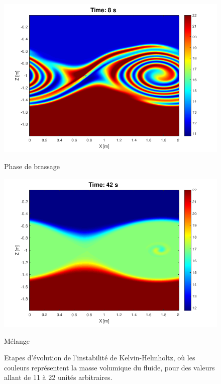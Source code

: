 \documentclass{rapportECC}
\begin{document}
\begin{figure}[htbp]
    \begin{minipage}{0.45\textwidth}
        \centering
        \includegraphics[width=\linewidth]{images/KHI3.png}
        \caption{Phase de brassage}
        \label{fig:KHI3}
    \end{minipage}
    \hspace{0.05\textwidth} %
    \begin{minipage}{0.45\textwidth}
        \centering
        \includegraphics[width=\linewidth]{images/KHI4.png}
        \caption{Mélange}
        \label{fig:KHI4}
    \end{minipage}
    \caption{Etapes d'évolution de l'instabilité de Kelvin-Helmholtz, où les couleurs représentent la masse volumique du fluide, pour des valeurs allant de 11 à 22 unités arbitraires.}
\end{figure}
\\
\vspace{0.5 cm}
\end{document}
